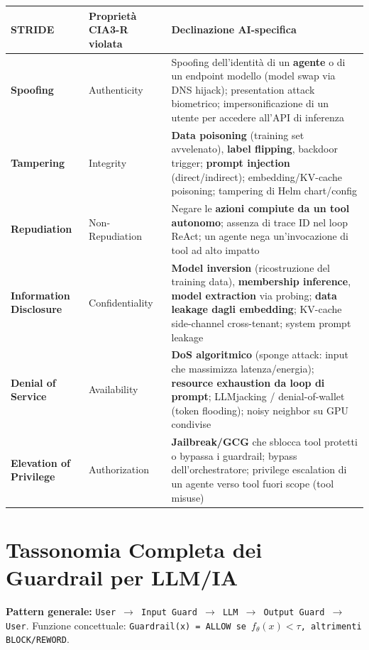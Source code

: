 \documentclass[11pt, a4paper]{article}
\begin{document}
\noindent
\begin{tabularx}{\textwidth}{|>{\bfseries}l|l|X|}
\hline
STRIDE & \textbf{Proprietà CIA3-R violata} & \textbf{Declinazione AI-specifica} \\ \hline
Spoofing & Authenticity & Spoofing dell'identità di un \textbf{agente} o di un endpoint modello (model swap via DNS hijack); presentation attack biometrico; impersonificazione di un utente per accedere all'API di inferenza \\ \hline
Tampering & Integrity & \textbf{Data poisoning} (training set avvelenato), \textbf{label flipping}, backdoor trigger; \textbf{prompt injection} (direct/indirect); embedding/KV-cache poisoning; tampering di Helm chart/config \\ \hline
Repudiation & Non-Repudiation & Negare le \textbf{azioni compiute da un tool autonomo}; assenza di trace ID nel loop ReAct; un agente nega un'invocazione di tool ad alto impatto \\ \hline
Information Disclosure & Confidentiality & \textbf{Model inversion} (ricostruzione del training data), \textbf{membership inference}, \textbf{model extraction} via probing; \textbf{data leakage dagli embedding}; KV-cache side-channel cross-tenant; system prompt leakage \\ \hline
Denial of Service & Availability & \textbf{DoS algoritmico} (sponge attack: input che massimizza latenza/energia); \textbf{resource exhaustion da loop di prompt}; LLMjacking / denial-of-wallet (token flooding); noisy neighbor su GPU condivise \\ \hline
Elevation of Privilege & Authorization & \textbf{Jailbreak/GCG} che sblocca tool protetti o bypassa i guardrail; bypass dell'orchestratore; privilege escalation di un agente verso tool fuori scope (tool misuse) \\ \hline
\end{tabularx}

\section{Tassonomia Completa dei Guardrail per LLM/IA}

\textbf{Pattern generale:} \texttt{User $\rightarrow$ Input Guard $\rightarrow$ LLM $\rightarrow$ Output Guard $\rightarrow$ User}. 
Funzione concettuale: \texttt{Guardrail(x) = ALLOW se $f_\theta(x) < \tau$, altrimenti BLOCK/REWORD}.
\end{document}
